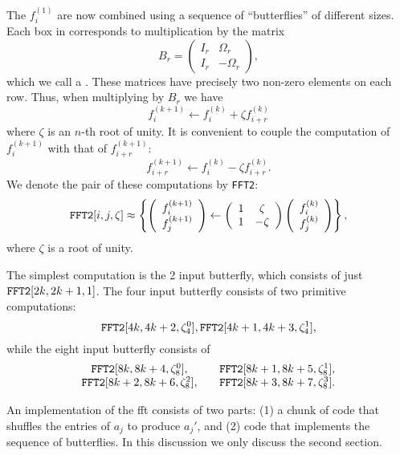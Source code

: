 The $f^{(1)}_i$ are now combined using a sequence of ``butterflies'' of
different sizes.  Each box in  corresponds to
multiplication by the matrix
\[
B_r = \left(\begin{array}{cc} I_r & \Omega_r \\I_r & - \Omega_r
\end{array}\right),
\]
which we call a .  These matrices have precisely
two non-zero elements on each row.  Thus, when multiplying by $B_r$ we
have
\[
f^{(k+1)}_i \leftarrow f^{(k)}_i + \zeta f^{(k)}_{i+r}
\]
where $\zeta$ is an $n$-th root of unity.  It is convenient to
couple the computation of $f^{(k+1)}_i$ with that of
$f^{(k+1)}_{i+r}$:
\[
f^{(k+1)}_{i+r} \leftarrow f^{(k)}_i - \zeta f^{(k)}_{i+r}.
\]
We denote the pair of these computations by {\tt FFT2}:
\[
\mbox{\tt FFT2}[i, j, \zeta] \approx
\left\{
\left(\begin{array}{c} f^{(k+1)}_i \\ f^{(k+1)}_j \end{array}\right)
\leftarrow
\left(\begin{array}{cc} 1 & \zeta \\ 1 & -\zeta \end{array}\right)
\left(\begin{array}{c} f^{(k)}_i \\ f^{(k)}_j \end{array}\right)
\right\},
\]
where $\zeta$ is a root of unity.

The simplest computation is the 2 input butterfly, which consists of
just $\mbox{\tt FFT2}[2k, 2k+1, 1]$.  The four input butterfly
consists of two primitive computations:
\[
\mbox{\tt FFT2}[4k, 4k+2, \zeta_4^0], \mbox{\tt FFT2}[4k+1, 4k+3, \zeta_4^1],
\]
while the eight input butterfly consists of 
\[
\begin{array}{cc}
\mbox{\tt FFT2}[8k, 8k+4, \zeta_8^0],& 
  \quad \mbox{\tt FFT2}[8k+1, 8k+5, \zeta_8^1], \\
\mbox{\tt FFT2}[8k+2, 8k+6, \zeta_8^2],&
  \quad \mbox{\tt FFT2}[8k+3, 8k+7, \zeta_8^3].
\end{array}
\]

An implementation of the {\sc fft} consists of two parts: (1) a chunk of
code that shuffles the entries of $a_j$ to produce $a_j'$, and (2)
code that implements the sequence of butterflies.  In this discussion
we only discuss the second section.

